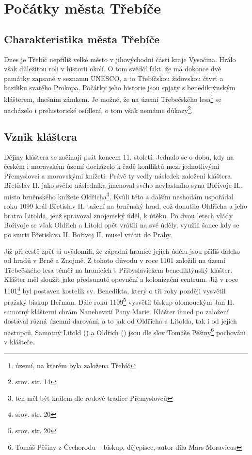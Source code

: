 \documentclass[a4paper,oneside,12pt]{report}
\begin{document}


\tableofcontents
\newpage




\setcounter{page}{1}

\chapter{Počátky města Třebíče}

\section{Charakteristika města Třebíče}

Dnes je Třebíč nepříliš velké město v jihovýchodní části kraje Vysočina.
Hrálo však důležitou roli v historii okolí.
O tom svědčí fakt, že má dokonce dvě památky zapsané v seznamu UNESCO, a to Třebíčskou židovskou čtvrť a baziliku svatého Prokopa.
Počátky jeho historie jsou spjaty s benediktýnským klášterem, dnešním zámkem.
Je možné, že na území Třebečského lesa\footnote{území, na kterém byla založena Třebíč} se nacházelo i prehistorické osídlení, o tom však nemáme důkazy\footnote{srov.  str. 14}.

\section{Vznik kláštera}

Dějiny kláštera se začínají psát koncem 11. století.
Jednalo se o dobu, kdy na českém i moravském území docházelo k řadě konfliktů mezi jednotlivými Přemyslovci a moravskými knížeti. Právě ty vedly následek založení kláštera.
Břetislav II. jako svého následníka jmenoval svého nevlastního syna Bořivoje II., místo brněnského knížete Oldřicha\footnote{ten měl být králem dle rodové tradice Přemyslovců}.
Kvůli této a dalším neshodám uspořádal roku 1099 král Břetislav II. tažení na brněnský hrad, což donutilo Oldřicha a jeho bratra Litolda, jenž spravoval znojemský úděl, k útěku.
Po dvou letech vlády Bořivoje se však Oldřich a Litold opět vrátili na své úděly, využili šance kdy se po smrti Břetislava II. Bořivoj II. musel vrátit do Prahy.

Již při cestě zpět si uvědomili, že západní hranice jejich údělu jsou příliš daleko od hradů v Brně a Znojmě.
Z tohoto důvodu v roce 1101 založili na území Třebečského lesa téměř na hranicích s Přibyslavickem benediktýnský klášter.
Klášter měl sloužit jako předsunuté opevnění a kolonizační centrum.
Již v roce 1101\footnote{srov. \cite{Uhlir1978} str. 20} byl postaven kostelík sv. Benedikta, který o tři roky později vysvětil pražský biskup Heřman.
Dále roku 1109\footnote{srov. \cite{Uhlir1978} str. 20} vysvětil biskup olomouckým Jan II. samotný klášterní chrám Nanebevztí Pany Marie.
Klášter ihned po založení dostával různá územní darování, a to jak od Oldřicha a Litolda, tak i od jejich nástupců.
Samotný Litold () a Oldřich () jsou dle slov Tomáše Pěšiny\footnote{Tomáš Pěšiny z Čechorodu -- biskup, dějepisec, autor díla Mars Moravicus} pochováni v klášteře.
\end{document}
